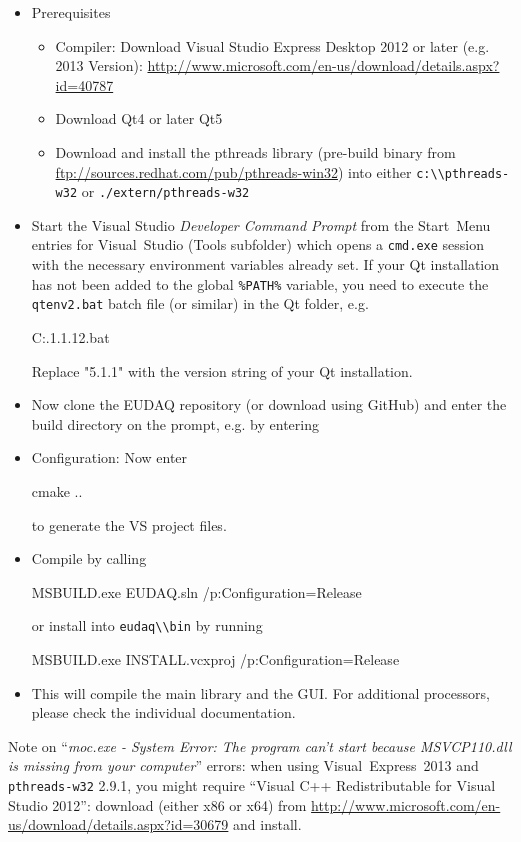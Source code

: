 \begin{itemize}
\item Prerequisites 
\begin{itemize}
\item Compiler: Download Visual Studio Express Desktop 2012 or later (e.g. 2013 Version):
  \url{http://www.microsoft.com/en-us/download/details.aspx?id=40787}
\item Download Qt4 or later Qt5
\item Download and install the pthreads library (pre-build binary from
  \url{ftp://sources.redhat.com/pub/pthreads-win32}) into either
  \texttt{\lstinline{c:\\pthreads-w32}} or \texttt{./extern/pthreads-w32}
\end{itemize}

\item Start the Visual Studio \emph{Developer Command Prompt} from the
  Start~Menu entries for Visual~Studio (Tools subfolder) which opens a
  \texttt{cmd.exe} session with the necessary environment variables
  already set. If your Qt installation has not been added to the
  global \texttt{\%PATH\%} variable, you need to execute the \texttt{qtenv2.bat} batch file (or similar) in the Qt folder, e.g.
  \begin{listing}[mybash]
C:\Qt{}.1\5.1.1\bin\qtenv2.bat
\end{listing}
Replace "5.1.1" with the version string of your Qt installation.

\item Now clone the EUDAQ repository (or download using GitHub) and enter the build directory on the prompt, e.g. by entering
  \begin{listing}[mybash]
cd c:\Users\[username]\Documents\GitHub\eudaq\build
\end{listing}

\item Configuration: Now enter
  \begin{listing}[mybash]
cmake ..
\end{listing}
to generate the VS project files.

\item Compile by calling
  \begin{listing}[mybash]
MSBUILD.exe EUDAQ.sln /p:Configuration=Release
\end{listing}
or install into \texttt{\lstinline{eudaq\\bin}} by running
  \begin{listing}[mybash]
MSBUILD.exe INSTALL.vcxproj /p:Configuration=Release
\end{listing}
\item This will compile the main library and the GUI. For additional processors, please check the individual documentation.
\end{itemize}

Note on ``\emph{moc.exe - System Error: The program can't start
  because MSVCP110.dll is missing from your computer}'' errors: when using Visual~Express~2013 and \texttt{pthreads-w32} 2.9.1, you might require ``Visual C++ Redistributable for Visual Studio 2012'': download (either x86 or x64) from \url{http://www.microsoft.com/en-us/download/details.aspx?id=30679} and install.

